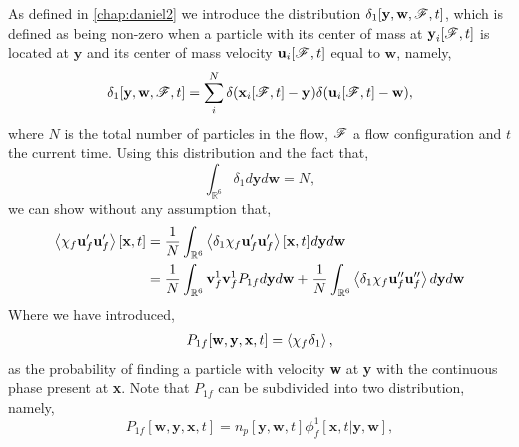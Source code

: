 As defined in \ref{chap:daniel2} we introduce the distribution $\delta_1[\textbf{y},\textbf{w},\mathscr{F},t]$, which is defined as being non-zero when a particle with its center of mass at $\textbf{y}_i[\mathscr{F},t]$ is located at $\textbf{y}$ and its center of mass velocity $\textbf{u}_i[\mathscr{F},t]$ equal to $\textbf{w}$, namely, 
\begin{equation*}
    \delta_1[\textbf{y},\textbf{w},\mathscr{F},t] =\sum_i^N \delta(\textbf{x}_i[\mathscr{F},t] - \textbf{y})\delta(\textbf{u}_i[\mathscr{F},t] - \textbf{w}),
\end{equation*}
where $N$ is the total number of particles in the flow, $\mathscr{F}$ a flow configuration and $t$ the current time. 
Using this distribution and the fact that, 
\begin{equation*}
    \int_{\mathbb{R}^6}
    \delta_1
    d \textbf{y}
    d \textbf{w}
    = N,
\end{equation*}
we can show without any assumption that, 
\begin{align}
    \avg{\chi_f \textbf{u}_f' \textbf{u}_f'}[\textbf{x},t]
    &= \frac{1}{N}
    \int_{\mathbb{R}^6}
    \avg{\delta_1\chi_f \textbf{u}_f' \textbf{u}_f'}[\textbf{x},t]
    d\textbf{y}
    d\textbf{w}\\
    &= 
    \frac{1}{N}
    \int_{\mathbb{R}^6}
    \textbf{v}_f^{1}
    \textbf{v}_f^{1}
    P_{1f}
    d\textbf{y}
    d\textbf{w}
    + 
    \frac{1}{N}
    \int_{\mathbb{R}^6}
    \avg{\delta_1 \chi_f\textbf{u}_f'' \textbf{u}_f''}
    d\textbf{y}
    d\textbf{w}
    \label{eq:classic_avg}
\end{align}
Where we have introduced,  
\begin{align}
    P_{1f} [\textbf{w},\textbf{y},\textbf{x},t]
    =
    \left<\chi_f \delta_1\right>,
\end{align}
as the probability of finding a particle with velocity \textbf{w} at \textbf{y} with the continuous phase present at \textbf{x}.
Note that $P_{1f}$ can be subdivided into two distribution, namely, 
\begin{equation}
    P_{1f} [\textbf{w},\textbf{y},\textbf{x},t]
    = n_p[\textbf{y},\textbf{w},t] \phi_f^1[\textbf{x},t|\textbf{y},\textbf{w}],
\end{equation}
